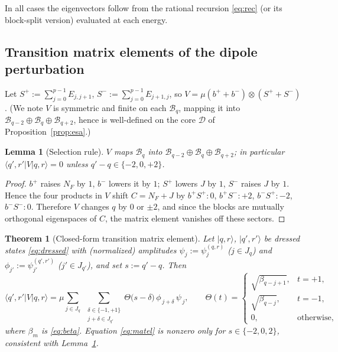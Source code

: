 \documentclass[12pt]{article}
\newtheorem{theorem}{Theorem}
\newtheorem{lemma}{Lemma}
\theoremstyle{definition}
\theoremstyle{remark}
\newcommand{\ket}[1]{\lvert #1\rangle}
\newcommand{\bra}[1]{\langle #1\rvert}
\newcommand{\bp}{b^{+}}
\newcommand{\bm}{b^{-}}
\begin{document}
In all cases the eigenvectors follow from the rational recursion \eqref{eq:rec} (or
its block-split version) evaluated at each energy.

\subsection{Transition matrix elements of the dipole perturbation}

Let $S^{+}:=\sum_{j=0}^{p-1}E_{j,j+1}$, $S^{-}:=\sum_{j=0}^{p-1}E_{j+1,j}$, so
$V=\mu(\bp+\bm)\otimes(S^{+}+S^{-})$. (We note $V$ is symmetric and finite on each
$\mathcal B_q$, mapping it into $\mathcal B_{q-2}\oplus\mathcal B_q\oplus\mathcal
B_{q+2}$, hence is well-defined on the core $\mathcal D$ of
Proposition~\ref{prop:esa}.)

\begin{lemma}[Selection rule]\label{lem:selection}
$V$ maps $\mathcal B_q$ into $\mathcal B_{q-2}\oplus\mathcal B_q\oplus\mathcal B_{q+2}$;
in particular $\bra{q',r'}V\ket{q,r}=0$ unless $q'-q\in\{-2,0,+2\}$.
\end{lemma}

\begin{proof}
$\bp$ raises $N_F$ by $1$, $\bm$ lowers it by $1$; $S^{+}$ lowers $J$ by $1$,
$S^{-}$ raises $J$ by $1$. Hence the four products in $V$ shift $C=N_F+J$ by
$\bp S^{+}\!:0$, $\bp S^{-}\!:+2$, $\bm S^{+}\!:-2$, $\bm S^{-}\!:0$. Therefore $V$
changes $q$ by $0$ or $\pm2$, and since the blocks are mutually orthogonal
eigenspaces of $C$, the matrix element vanishes off these sectors.
\end{proof}

\begin{theorem}[Closed-form transition matrix element]\label{thm:transition}
Let $\ket{q,r}$, $\ket{q',r'}$ be dressed states \eqref{eq:dressed} with (normalized)
amplitudes $\psi_j:=\psi^{(q,r)}_j$ ($j\in J_q$) and $\phi_{j'}:=\psi^{(q',r')}_{j'}$
($j'\in J_{q'}$), and set $s:=q'-q$. Then
\begin{equation}\label{eq:matel}
\bra{q',r'}V\ket{q,r}
=\mu\sum_{j\in J_q}\;\sum_{\substack{\delta\in\{-1,+1\}\\ j+\delta\in J_{q'}}}
\Theta\bigl(s-\delta\bigr)\,\phi_{\,j+\delta}\,\psi_{\,j},
\qquad
\Theta(t)=\begin{cases}\sqrt{\beta_{q-j+1}}, & t=+1,\\[2pt]
\sqrt{\beta_{q-j}}, & t=-1,\\[2pt] 0, & \text{otherwise},\end{cases}
\end{equation}
where $\beta_m$ is \eqref{eq:beta}. Equation \eqref{eq:matel} is nonzero only for
$s\in\{-2,0,2\}$, consistent with Lemma~\ref{lem:selection}.
\end{theorem}
\end{document}
